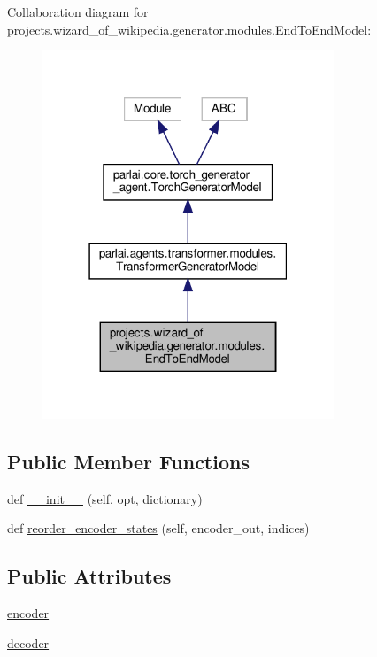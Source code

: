 Collaboration diagram for projects.\+wizard\+\_\+of\+\_\+wikipedia.\+generator.\+modules.\+End\+To\+End\+Model\+:
\nopagebreak
\begin{figure}[H]
\begin{center}
\leavevmode
\includegraphics[width=247pt]{classprojects_1_1wizard__of__wikipedia_1_1generator_1_1modules_1_1EndToEndModel__coll__graph}
\end{center}
\end{figure}
\subsection*{Public Member Functions}
\begin{DoxyCompactItemize}
\item 
def \hyperlink{classprojects_1_1wizard__of__wikipedia_1_1generator_1_1modules_1_1EndToEndModel_a247a986cf18f9711f93d2336d653779e}{\+\_\+\+\_\+init\+\_\+\+\_\+} (self, opt, dictionary)
\item 
def \hyperlink{classprojects_1_1wizard__of__wikipedia_1_1generator_1_1modules_1_1EndToEndModel_a619ee6377355376fd7fe43779dc54bea}{reorder\+\_\+encoder\+\_\+states} (self, encoder\+\_\+out, indices)
\end{DoxyCompactItemize}
\subsection*{Public Attributes}
\begin{DoxyCompactItemize}
\item 
\hyperlink{classprojects_1_1wizard__of__wikipedia_1_1generator_1_1modules_1_1EndToEndModel_a4d6ecf9a0df55b1124ffd4eec6bfb018}{encoder}
\item 
\hyperlink{classprojects_1_1wizard__of__wikipedia_1_1generator_1_1modules_1_1EndToEndModel_ab5c118e09c397fc75ccf49fb45119bd1}{decoder}
\end{DoxyCompactItemize}


